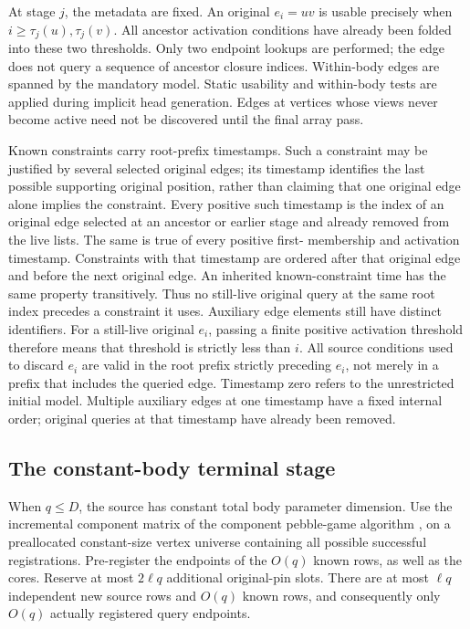 \documentclass[11pt,a4paper]{article}
\theoremstyle{definition}
\theoremstyle{remark}
\begin{document}
At stage $j$, the metadata are fixed. An original
$e_i=uv$ is usable precisely when
$i\geq\tau_j(u),\tau_j(v)$.
All ancestor activation conditions have already
been folded into these two thresholds.
Only two endpoint lookups are performed; the edge
does not query a sequence of ancestor closure indices.
Within-body edges are spanned by the mandatory
model. Static usability and within-body tests are
applied during implicit head generation.
Edges at vertices whose views never become active
need not be discovered until the final array pass.

Known constraints carry root-prefix timestamps. Such a constraint
may be justified by several selected original edges; its timestamp
identifies the last possible supporting original position, rather
than claiming that one original edge alone implies the constraint.
Every positive such timestamp is the index of an original edge
selected at an ancestor or earlier stage and already removed
from the live lists. The same is true of every positive first-
membership and activation timestamp.
Constraints with that timestamp are ordered
after that original edge and before the next
original edge. An inherited known-constraint time
has the same property transitively.
Thus no still-live original query at the same
root index precedes a constraint it uses.
Auxiliary edge elements still have distinct identifiers.
For a still-live original $e_i$, passing a finite positive
activation threshold therefore means that threshold is strictly
less than $i$. All source conditions used to discard $e_i$ are
valid in the root prefix strictly preceding $e_i$, not merely in
a prefix that includes the queried edge. Timestamp zero refers
to the unrestricted initial model. Multiple auxiliary edges at
one timestamp have a fixed internal order; original queries at
that timestamp have already been removed.

\subsection{The constant-body terminal stage}

When $q\leq D$, the source has constant total body
parameter dimension. Use the incremental component
matrix of the component pebble-game algorithm
\cite{quadratic}, on a preallocated constant-size
vertex universe containing all possible successful
registrations.
Pre-register the endpoints of the $O(q)$ known rows, as well as
the cores. Reserve at most $2\ell q$ additional original-pin slots.
There are at most $\ell q$ independent new source
rows and $O(q)$ known rows, and consequently only
$O(q)$ actually registered query endpoints.
\end{document}
